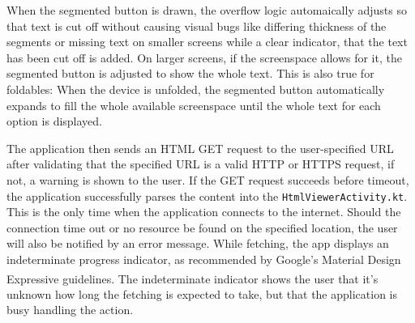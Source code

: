 \documentclass[a4paper,12pt]{report}
\begin{document}
\parbox[t]{\textwidth}{
When the segmented button is drawn, the overflow logic automaically adjusts so that text is cut off without causing visual bugs like differing thickness of the segments or missing text on smaller screens while a clear indicator, that the text has been cut off is added. On larger screens, if the screenspace allows for it, the segmented button is adjusted to show the whole text. This is also true for foldables: When the device is unfolded, the segmented button automatically expands to fill the whole available screenspace until the whole text for each option is displayed. 
}

The application then sends an HTML GET request to the user-specified URL after validating that the specified URL is a valid HTTP or HTTPS request, if not, a warning is shown to the user. If the GET request succeeds before timeout, the application successfully parses the content into the \texttt{HtmlViewerActivity.kt}. This is the only time when the application connects to the internet. Should the connection time out or no resource be found on the specified location, the user will also be notified by an error message. While fetching, the app displays an indeterminate progress indicator, as recommended by Google's Material Design Expressive guidelines.\textsuperscript{\citep{lin-prog-ind}} The indeterminate indicator shows the user that it's unknown how long the fetching is expected to take, but that the application is busy handling the action.
\end{document}
